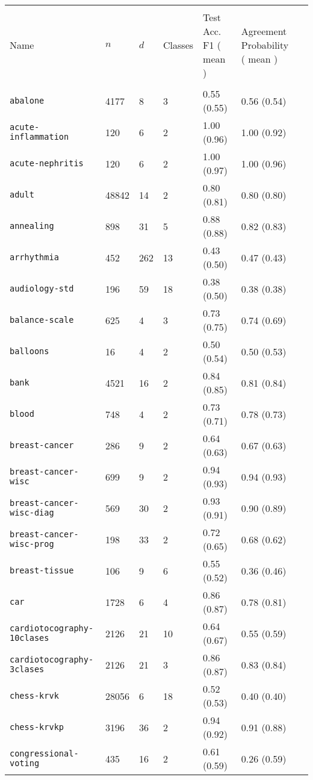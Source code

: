 \begin{tabular}{lllllll} 
\toprule \\ 
Name & $n$ & $d$    & Classes & Test Acc. F1 ( mean )    & Agreement Probability ( mean ) \\ 
\midrule \\ 
\verb!abalone! & 4177 & 8 & 3 & 0.55 (0.55) & 0.56 (0.54)\\ 
\verb!acute-inflammation! & 120 & 6 & 2 & 1.00 (0.96) & 1.00 (0.92)\\ 
\verb!acute-nephritis! & 120 & 6 & 2 & 1.00 (0.97) & 1.00 (0.96)\\ 
\verb!adult! & 48842 & 14 & 2 & 0.80 (0.81) & 0.80 (0.80)\\ 
\verb!annealing! & 898 & 31 & 5 & 0.88 (0.88) & 0.82 (0.83)\\ 
\verb!arrhythmia! & 452 & 262 & 13 & 0.43 (0.50) & 0.47 (0.43)\\ 
\verb!audiology-std! & 196 & 59 & 18 & 0.38 (0.50) & 0.38 (0.38)\\ 
\verb!balance-scale! & 625 & 4 & 3 & 0.73 (0.75) & 0.74 (0.69)\\ 
\verb!balloons! & 16 & 4 & 2 & 0.50 (0.54) & 0.50 (0.53)\\ 
\verb!bank! & 4521 & 16 & 2 & 0.84 (0.85) & 0.81 (0.84)\\ 
\verb!blood! & 748 & 4 & 2 & 0.73 (0.71) & 0.78 (0.73)\\ 
\verb!breast-cancer! & 286 & 9 & 2 & 0.64 (0.63) & 0.67 (0.63)\\ 
\verb!breast-cancer-wisc! & 699 & 9 & 2 & 0.94 (0.93) & 0.94 (0.93)\\ 
\verb!breast-cancer-wisc-diag! & 569 & 30 & 2 & 0.93 (0.91) & 0.90 (0.89)\\ 
\verb!breast-cancer-wisc-prog! & 198 & 33 & 2 & 0.72 (0.65) & 0.68 (0.62)\\ 
\verb!breast-tissue! & 106 & 9 & 6 & 0.55 (0.52) & 0.36 (0.46)\\ 
\verb!car! & 1728 & 6 & 4 & 0.86 (0.87) & 0.78 (0.81)\\ 
\verb!cardiotocography-10clases! & 2126 & 21 & 10 & 0.64 (0.67) & 0.55 (0.59)\\ 
\verb!cardiotocography-3clases! & 2126 & 21 & 3 & 0.86 (0.87) & 0.83 (0.84)\\ 
\verb!chess-krvk! & 28056 & 6 & 18 & 0.52 (0.53) & 0.40 (0.40)\\ 
\verb!chess-krvkp! & 3196 & 36 & 2 & 0.94 (0.92) & 0.91 (0.88)\\ 
\verb!congressional-voting! & 435 & 16 & 2 & 0.61 (0.59) & 0.26 (0.59)\\ 

\end{tabular}
